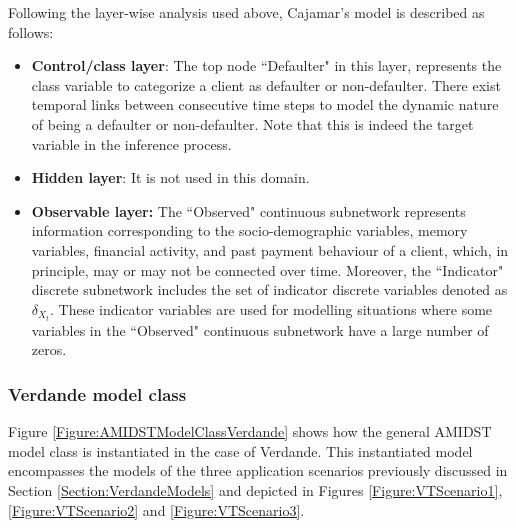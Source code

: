 Following the layer-wise analysis used above, Cajamar's model is described as follows:
\begin{itemize}

\item \textbf{Control/class layer}: The top node ``Defaulter" in this layer, represents the class variable to categorize a client as defaulter or non-defaulter. There exist temporal links between consecutive time steps to model the dynamic nature of being a defaulter or non-defaulter. Note that this is indeed the target variable in the inference process.

\item \textbf{Hidden layer}: It is not used in this domain.

\item \textbf{Observable layer:} The ``Observed" continuous subnetwork represents information corresponding to the socio-demographic variables, memory variables, financial activity, and past payment behaviour of a client, which, in principle, may or may not be connected over time. Moreover, the ``Indicator" discrete subnetwork includes the set of indicator discrete variables denoted as $\delta_{X_t}$. These indicator variables are used for modelling situations where some variables in the ``Observed" continuous subnetwork have a large number of zeros.

\end{itemize}


\subsubsection{Verdande model class}\label{verdandeAMIDSTModels}

Figure \ref{Figure:AMIDSTModelClassVerdande} shows how the general AMIDST model class is instantiated in the case of Verdande. This instantiated model encompasses the models of the three application scenarios previously discussed in Section \ref{Section:VerdandeModels} and depicted in Figures \ref{Figure:VTScenario1}, \ref{Figure:VTScenario2} and \ref{Figure:VTScenario3}.

